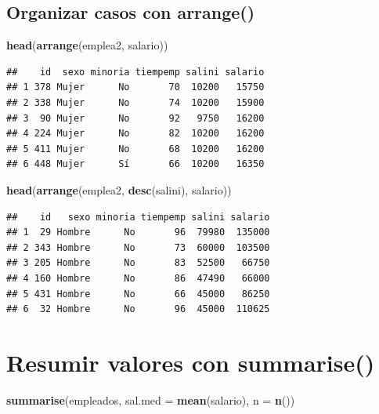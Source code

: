 \documentclass[]{book}
\newenvironment{Shaded}{\begin{snugshade}}{\end{snugshade}}
\newcommand{\KeywordTok}[1]{\textcolor[rgb]{0.13,0.29,0.53}{\textbf{#1}}}
\newcommand{\DataTypeTok}[1]{\textcolor[rgb]{0.13,0.29,0.53}{#1}}
\newcommand{\NormalTok}[1]{#1}
\begin{document}
\subsection{\texorpdfstring{Organizar casos con
\textbf{arrange()}}{Organizar casos con arrange()}}\label{organizar-casos-con-arrange}

\begin{Shaded}
\begin{Highlighting}[]
\KeywordTok{head}\NormalTok{(}\KeywordTok{arrange}\NormalTok{(emplea2, salario))}
\end{Highlighting}
\end{Shaded}

\begin{verbatim}
##    id  sexo minoria tiempemp salini salario
## 1 378 Mujer      No       70  10200   15750
## 2 338 Mujer      No       74  10200   15900
## 3  90 Mujer      No       92   9750   16200
## 4 224 Mujer      No       82  10200   16200
## 5 411 Mujer      No       68  10200   16200
## 6 448 Mujer      Sí       66  10200   16350
\end{verbatim}

\begin{Shaded}
\begin{Highlighting}[]
\KeywordTok{head}\NormalTok{(}\KeywordTok{arrange}\NormalTok{(emplea2, }\KeywordTok{desc}\NormalTok{(salini), salario))}
\end{Highlighting}
\end{Shaded}

\begin{verbatim}
##    id   sexo minoria tiempemp salini salario
## 1  29 Hombre      No       96  79980  135000
## 2 343 Hombre      No       73  60000  103500
## 3 205 Hombre      No       83  52500   66750
## 4 160 Hombre      No       86  47490   66000
## 5 431 Hombre      No       66  45000   86250
## 6  32 Hombre      No       96  45000  110625
\end{verbatim}

\section{\texorpdfstring{Resumir valores con
\textbf{summarise()}}{Resumir valores con summarise()}}\label{resumir-valores-con-summarise}

\begin{Shaded}
\begin{Highlighting}[]
\KeywordTok{summarise}\NormalTok{(empleados, }\DataTypeTok{sal.med =} \KeywordTok{mean}\NormalTok{(salario), }\DataTypeTok{n =} \KeywordTok{n}\NormalTok{())}
\end{Highlighting}
\end{Shaded}
\end{document}
